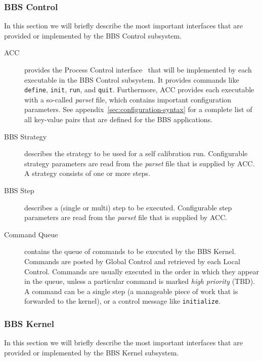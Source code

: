 \documentclass[10pt]{lofar}
\begin{document}
\subsubsection{BBS Control}
\label{subsubsec:interf-control}
In this section we will briefly describe the most important interfaces that
are provided or implemented by the BBS Control subsystem.
\begin{description}
\item [ACC] provides the Process Control interface~\cite{LOFAR-ASTRON-SDD-037}
that will be implemented by each executable in the BBS Control subsystem. It
provides commands like \texttt{define}, \texttt{init}, \texttt{run}, and
\texttt{quit}. Furthermore, ACC provides each executable with a so-called
\emph{parset} file, which contains important configuration parameters. See
appendix~\ref{sec:configuration-syntax} for a complete list of all key-value
pairs that are defined for the BBS applications.
\item [BBS Strategy] describes the strategy to be used for a self calibration
run. Configurable strategy parameters are read from the \emph{parset} file that
is supplied by ACC. A strategy consists of one or more steps.
\item [BBS Step] describes a (single or multi) step to be executed. Configurable
step parameters are read from the \emph{parset} file that is supplied by ACC.
\item [Command Queue] contains the queue of commands to be executed by the BBS
Kernel. Commands are posted by Global Control and retrieved by each Local
Control. Commands are usually executed in the order in which they appear in
the queue, unless a particular command is marked \emph{high priority} (TBD). A
command can be a single step (a manageable piece of work that is forwarded to
the kernel), or a control message like \texttt{initialize}.
\end{description}


\subsubsection{BBS Kernel}
\label{subsubsec:interf-kernel}

In this section we will briefly describe the most important interfaces that
are provided or implemented by the BBS Kernel subsystem.
\end{document}
